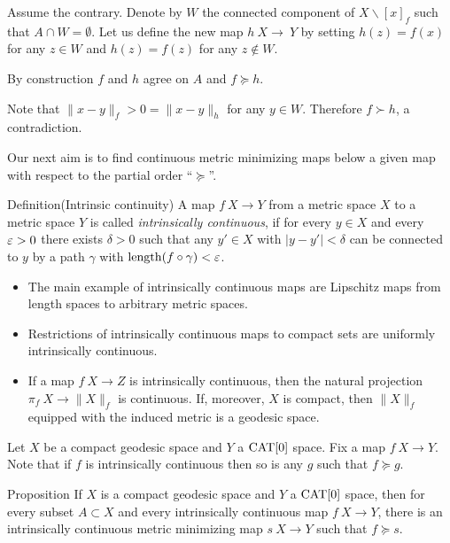 \documentclass{article}
\begin{document}
Assume the contrary.
Denote by $W$ the connected component of $X\backslash [x]_f$ such that $A\cap W=\emptyset$.
Let us define the new map $h\:X\to\ Y$ by setting $h(z)=f(x)$ for any $z\in W$ and $h(z)=f(z)$ for any $z\notin W$.

By construction $f$ and $h$ agree on $A$ and $f\succcurlyeq h$.

Note that $\|x-y\|_f>0=\|x-y\|_h$ for any $y\in W$.
Therefore $f\succ h$, a contradiction.
\qeds

Our next aim is to 
find continuous metric minimizing maps below a given map with respect to the partial order ``$\succcurlyeq$''.

\begin{thm}{Definition}(Intrinsic continuity)
A map $f\:X\to Y$ from a metric space $X$ to a metric space
 $Y$ is called
{\em intrinsically continuous}, if for every $y\in X$ 
and every $\varepsilon>0$ there
exists $\delta>0$ such that any  $y'\in X$
with $|y-y'|<\delta$ can be connected to $y$ by a path $\gamma$ 
with $\mathop{\rm length}\nolimits(f\circ\gamma)<\varepsilon$.
\end{thm}

\begin{itemize}
 \item The main example of intrinsically continuous maps are Lipschitz
maps from length spaces to arbitrary metric spaces.
\item Restrictions of intrinsically continuous maps to compact sets are uniformly intrinsically continuous. %
\item If a map $f\:X\to Z$ is intrinsically continuous, then 
the natural projection $\pi_f\:X\rightarrow \|X\|_f$ is continuous. 
If, moreover, $X$ is compact, then $\|X\|_f$ equipped with the induced 
metric is a geodesic space.
\end{itemize}


Let $X$ be a compact geodesic space and $Y$ a $\mathop{\rm CAT}\nolimits[0]$ space. 
Fix a map $f\:X\to Y$.
Note that if $f$ is intrinsically continuous then so is any $g$ such that $f\succcurlyeq g$.

\begin{thm}{Proposition}\label{prop:exist}
If $X$ is a compact geodesic space and $Y$ a $\mathop{\rm CAT}\nolimits[0]$ space, then for every subset $A\subset X$ and every intrinsically continuous map $f\:X\rightarrow Y$,
there is an intrinsically continuous  metric minimizing map $s\:X\rightarrow Y$
such that $f\succcurlyeq s$.
\end{thm}
\end{document}
